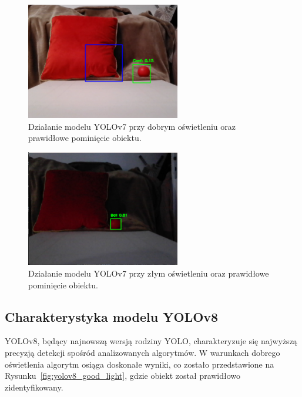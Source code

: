 \documentclass[a4paper,twoside,12pt]{book}
\begin{document}
\begin{figure}[!hb]
    \centering
    \includegraphics[width=0.6\textwidth]{Images/Porownanie/Yolo7 robot/Zrzut ekranu 2025-01-02 194354.png}
    \caption{Działanie modelu YOLOv7 przy dobrym oświetleniu oraz prawidłowe pominięcie obiektu.}
    \label{fig:yolov7_good_light_good_object}
\end{figure}
\begin{figure}[h]
    \centering
    \includegraphics[width=0.6\textwidth]{Images/Porownanie/Yolo7 robot/Zrzut ekranu 2025-01-02 194641.png}
    \caption{Działanie modelu YOLOv7 przy złym oświetleniu oraz prawidłowe pominięcie obiektu.}
    \label{fig:yolov7_bad_light_good_object}
\end{figure}

\newpage
\subsection{Charakterystyka modelu YOLOv8}

YOLOv8, będący najnowszą wersją rodziny YOLO, charakteryzuje się najwyższą precyzją detekcji spośród analizowanych algorytmów. W warunkach dobrego oświetlenia algorytm osiąga doskonałe wyniki, co zostało przedstawione na Rysunku~\ref{fig:yolov8_good_light}, gdzie obiekt został prawidłowo zidentyfikowany. 
\end{document}
